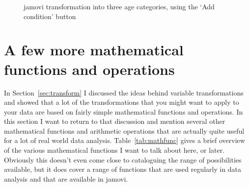 \begin{figure}[p]
\begin{center}
\caption{jamovi transformation into three age categories, using the `Add condition' button}
\label{fig:transform3}
\end{center}
\end{figure}

\newpage

\section{A few more mathematical functions and operations~\label{sec:mathfunc}}

In Section~\ref{sec:transform} I discussed the ideas behind variable transformations and showed that a lot of the transformations that you might want to apply to your data are based on fairly simple mathematical functions and operations. In this section I want to return to that discussion and mention several other mathematical functions and arithmetic operations that are actually quite useful for a lot of real world data analysis. Table~\ref{tab:mathfunc} gives a brief overview of the various mathematical functions I want to talk about here, or later. Obviously this doesn't even come close to cataloguing the range of possibilities available, but it does cover a range of functions that are used regularly in data analysis and that are available in jamovi.

